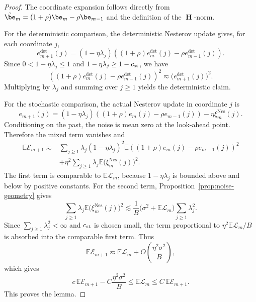 \begin{proof}
The coordinate expansion follows directly from \(\tilde\be_m=(1+\rho)\be_m-\rho\be_{m-1}\) and the definition of the \(\operatorname{\bm H}\)-norm.

For the deterministic comparison, the deterministic Nesterov update gives, for each coordinate \(j\),
\[
    e_{m+1}^{\mathrm{det}}(j)
    =
    (1-\eta\lambda_j)
    \left((1+\rho)e_m^{\mathrm{det}}(j)-\rho e_{m-1}^{\mathrm{det}}(j)\right).
\]
Since \(0<1-\eta\lambda_j\le1\) and \(1-\eta\lambda_j\ge1-c_{\rm st}\), we have
\[
    \left((1+\rho)e_m^{\mathrm{det}}(j)-\rho e_{m-1}^{\mathrm{det}}(j)\right)^2
    \eqsim
    \bigl(e_{m+1}^{\mathrm{det}}(j)\bigr)^2.
\]
Multiplying by \(\lambda_j\) and summing over \(j\ge1\) yields the deterministic claim.

For the stochastic comparison, the actual Nesterov update in coordinate \(j\) is
\[
    e_{m+1}(j)
    =
    (1-\eta\lambda_j)
    \left((1+\rho)e_m(j)-\rho e_{m-1}(j)\right)
    -\eta\xi_m^{\mathrm{Nes}}(j).
\]
Conditioning on the past, the noise is mean zero at the look-ahead point.  Therefore the mixed term vanishes and
\[
\begin{aligned}
    \mathbb{E}\mathcal E_{m+1}
    \eqsim{}&
    \sum_{j\ge1}\lambda_j(1-\eta\lambda_j)^2
    \mathbb{E}\left((1+\rho)e_m(j)-\rho e_{m-1}(j)\right)^2 \\
    &+
    \eta^2\sum_{j\ge1}\lambda_j\mathbb{E}\bigl(\xi_m^{\mathrm{Nes}}(j)\bigr)^2 .
\end{aligned}
\]
The first term is comparable to \(\mathbb{E}\mathcal L_m\), because \(1-\eta\lambda_j\) is bounded above and below by positive constants.  For the second term, Proposition~\ref{prop:noise-geometry} gives
\[
    \sum_{j\ge1}\lambda_j\mathbb{E}\bigl(\xi_m^{\mathrm{Nes}}(j)\bigr)^2
    \lesssim
    \frac{1}{B}\bigl(\sigma^2+\mathbb{E}\mathcal L_m\bigr)
    \sum_{j\ge1}\lambda_j^2.
\]
Since \(\sum_{j\ge1}\lambda_j^2<\infty\) and \(c_{\rm st}\) is chosen small, the term proportional to \(\eta^2\mathbb{E}\mathcal L_m/B\) is absorbed into the comparable first term.  Thus
\[
    \mathbb{E}\mathcal E_{m+1}
    \eqsim
    \mathbb{E}\mathcal L_m
    +O\left(\frac{\eta^2\sigma^2}{B}\right),
\]
which gives
\[
    c\,\mathbb{E}\mathcal E_{m+1}-C\frac{\eta^2\sigma^2}{B}
    \le
    \mathbb{E}\mathcal L_m
    \le
    C\,\mathbb{E}\mathcal E_{m+1}.
\]
This proves the lemma.
\end{proof}

